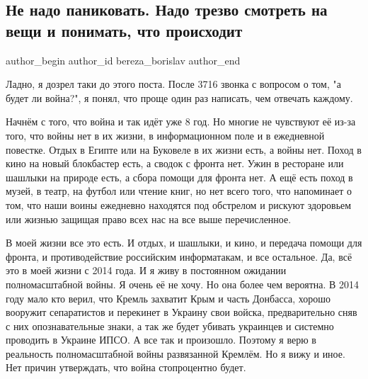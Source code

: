  
 
 
 
 
 
\subsection{Не надо паниковать. Надо трезво смотреть на вещи и понимать, что происходит}
\label{sec:24_01_2022.fb.bereza_borislav.1.ne_nado_panikovat}
 
\ifcmt
 author_begin
   author_id bereza_borislav
 author_end
\fi

Ладно, я дозрел таки до этого поста. После 3716 звонка с вопросом о том, "а
будет ли война?", я понял, что проще один раз написать, чем отвечать каждому. 

Начнём с того, что война и так идёт уже 8 год. Но многие не чувствуют её из-за
того, что войны нет в их жизни, в информационном поле и в ежедневной повестке.
Отдых в Египте или на Буковеле в их жизни есть, а войны нет. Поход в кино на
новый блокбастер есть, а сводок с фронта нет. Ужин в ресторане или шашлыки на
природе есть, а сбора помощи для фронта нет. А ещё есть поход в музей, в театр,
на футбол или чтение книг, но нет всего того, что напоминает о том, что наши
воины ежедневно находятся под обстрелом и рискуют здоровьем или жизнью защищая
право всех нас на все выше перечисленное. 

В моей жизни все это есть. И отдых, и  шашлыки, и кино, и передача помощи для
фронта, и противодействие российским информатакам, и все остальное. Да, всё это
в моей жизни с 2014 года. И я живу в постоянном ожидании полномасштабной войны.
Я очень её не хочу. Но она более чем вероятна. В 2014 году мало кто верил, что
Кремль захватит Крым и часть Донбасса, хорошо вооружит сепаратистов и перекинет
в Украину свои войска, предварительно сняв с них опознавательные знаки, а так
же будет убивать украинцев и системно проводить в Украине ИПСО. А все так и
произошло. Поэтому я верю в реальность полномасштабной войны развязанной
Кремлём. Но я вижу и иное. Нет причин утверждать, что война стопроцентно будет.

